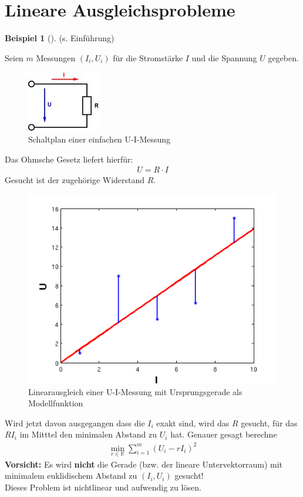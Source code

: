 \documentclass[ngerman,fontsize=11pt, paper=a4, parskip=half, titlepage=true, toc=bib]{scrbook}
\theoremstyle{definition}
\newtheorem{Bsp}[Def]{Beispiel}
\theoremstyle{plain}
\newcommand{\R}{\mathds{R}}
\newcommand{\sectione}[1]{\section{#1} \setcounter{equation}{0}}
\newcommand{\subsectione}[1]{\subsection{#1} \addtocounter{Def}{1}}
\newenvironment{Bspe}[1][]{ %
	\begin{Bsp}[#1]
	}
	{
	\end{Bsp}
	\addtocounter{subsection}{1}
}
\begin{document}
  
  \sectione{Lineare Ausgleichsprobleme} 
  
  \begin{Bspe}
  	(s. Einführung)
  	
  	Seien $m$ Messungen $(I_i, U_i)$ für die Stromstärke $I$ und die Spannung $U$ gegeben. \\
  	
  	\begin{figure}
  		\parbox{\linewidth}{
  			\centering
  			\includegraphics{images/ohmsche.jpeg}
  		}
  		\caption{Schaltplan einer einfachen U-I-Messung}
  	\end{figure}
  	
  	Das Ohmsche Gesetz liefert hierfür:
  	\begin{gather*}
  	U=R\cdot I
  	\end{gather*}
  	Gesucht ist der zugehörige Widerstand $R$.\\
  	
  	\begin{figure}
  		\parbox{\linewidth}{
  			\centering
  			\includegraphics[width=0.5\linewidth]{images/linausgl2.png}
  		}
  		\caption{Linearausgleich einer U-I-Messung mit Ursprungsgerade als Modellfunktion}
  	\end{figure}
  	
  	Wird jetzt davon ausgegangen dass die $I_i$ exakt sind, wird das $R$ gesucht, 
  	für das $RI_i$ im Mitttel den minimalen Abstand zu $U_i$ hat.
  	Genauer gesagt berechne
  	\begin{gather*}
  	\min_{r\in\R} \sum_{i=1}^{m}(U_i-rI_i)^2
  	\end{gather*}
  	\textbf{Vorsicht: } Es wird \textbf{nicht} die Gerade (bzw. der lineare Untervektorraum) mit 
  	minimalem euklidischem Abstand zu $(I_i,U_i)$ gesucht! \\
  	Dieses Problem ist nichtlinear und aufwendig zu lösen.
  \end{Bspe}
\end{document}
